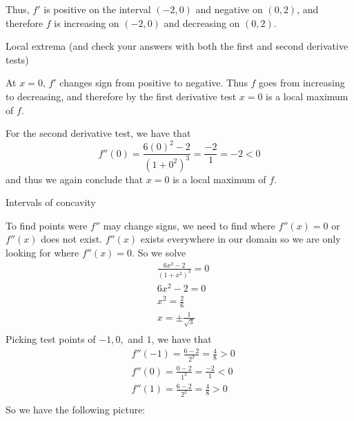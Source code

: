 \documentclass[handout,nooutcomes]{ximera}
\renewenvironment{freeResponse}{
\ifhandout\setbox0\vbox\bgroup\else
\begin{trivlist}\item[\hskip \labelsep\bfseries Solution:\hspace{2ex}]
\fi}
{\ifhandout\egroup\else
\end{trivlist}
\fi}
\begin{document}
\begin{problem}
\begin{enumerate}
\begin{freeResponse}
\begin{center}
\begin{image}
\end{image}
\end{center}


		Thus, $f'$ is positive on the interval $(-2,0)$ and negative on $(0,2)$, and therefore $f$ is increasing on $(-2,0)$ and decreasing on $(0,2)$.  
		\end{freeResponse}
		
	\item  Local extrema (and check your answers with both the first and second derivative tests)
	
		\begin{freeResponse}
		At $x=0$, $f'$ changes sign from positive to negative.  Thus $f$ goes from increasing to decreasing, and therefore by the first derivative test $x=0$ is a local maximum of $f$.  
		
		For the second derivative test, we have that
		$$ f''(0) = \frac{6(0)^2 - 2}{(1+0^2)^3} = \frac{-2}{1} = -2 < 0 $$
		and thus we again conclude that $x=0$ is a local maximum of $f$.
		\end{freeResponse}
		
	\item  Intervals of concavity
	
		\begin{freeResponse}
		To find points were $f''$ may change signs, we need to find where $f''(x)=0$ or $f''(x)$ does not exist.  $f''(x)$ exists everywhere in our domain so we are only looking for where $f''(x)=0$.  So we solve
		\begin{align*}
  		& \frac{6{{x}^{2}}-2}{{{(1+{{x}^{2}})}^{3}}}=0 \\ 
 		& 6{{x}^{2}}-2=0 \\ 
 		& {{x}^{2}}=\frac{2}{6} \\ 
 		& x=\pm \frac{1}{\sqrt{3}} \\ 
		\end{align*}
		Picking test points of $-1, 0, $ and $1$, we have that
		\begin{align*}
		& f''(-1) = \frac{6-2}{2^3} = \frac{4}{8} > 0 \\
		& f''(0) = \frac{0-2}{1^3} = \frac{-2}{1} < 0 \\
		& f''(1) = \frac{6-2}{2^3} = \frac{4}{8} > 0 \\
		\end{align*}
		So we have the following picture:
		

\end{freeResponse}
\end{enumerate}
\end{problem}
\end{document}

